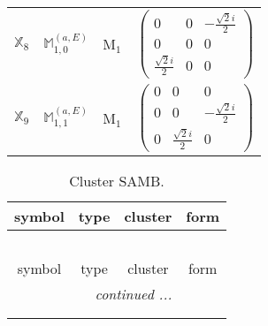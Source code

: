 \documentclass[fleqn,10pt,landscape]{article}
\begin{document}
\begin{itemize}
\begin{center}
\begin{longtable}{c|c|c|c}
$ \mathbb{X}_{8} $ & $\mathbb{M}_{1,0}^{(a,E)}$ & M$_{1}$ & $\begin{pmatrix} 0 & 0 & - \frac{\sqrt{2} i}{2} \\ 0 & 0 & 0 \\ \frac{\sqrt{2} i}{2} & 0 & 0 \end{pmatrix}$ \\
$ \mathbb{X}_{9} $ & $\mathbb{M}_{1,1}^{(a,E)}$ & M$_{1}$ & $\begin{pmatrix} 0 & 0 & 0 \\ 0 & 0 & - \frac{\sqrt{2} i}{2} \\ 0 & \frac{\sqrt{2} i}{2} & 0 \end{pmatrix}$ \\
\end{longtable}
\end{center}
\begin{center}
\renewcommand{\arraystretch}{1.3}
\begin{longtable}{c|c|c|c}
\caption{Cluster SAMB.}
 \\
 \hline \hline
symbol & type & cluster & form \\ \hline \endfirsthead

\multicolumn{3}{l}{\tablename\ \thetable{}} \\
 \hline \hline
symbol & type & cluster & form \\ \hline \endhead

 \hline \hline
\multicolumn{3}{r}{\footnotesize\it continued ...} \\ \endfoot

 \hline \hline
\multicolumn{3}{r}{} \\ \endlastfoot


\end{longtable}
\end{center}
\end{itemize}
\end{document}

